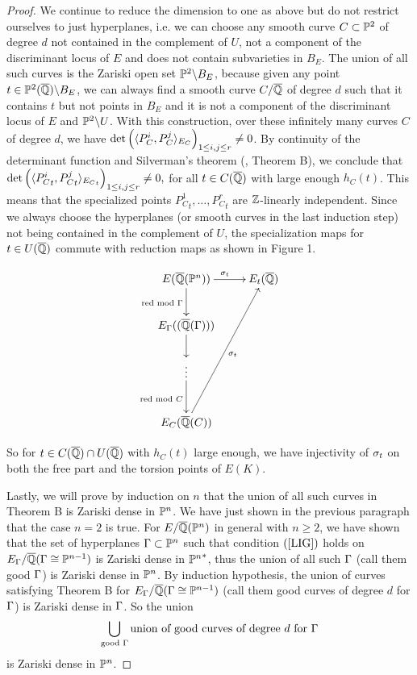 \documentclass[12pt,reqno]{amsart}
\begin{document}
\begin{proof}
We continue to reduce the dimension to one as above but do not restrict ourselves to just hyperplanes, i.e. we can choose any smooth curve $C \subset \mathbb{P}^2$ of degree $d$ not contained in the complement of $U$, not a component of the discriminant locus of $E$ and does not contain subvarieties in $B_E$. The union of all such curves is the Zariski open set $\mathbb{P}^2\backslash B_E$, because given any point $t \in \mathbb{P}^2(\overline{\mathbb{Q}})\backslash B_E$, we can always find a smooth curve $C/\overline{\mathbb{Q}}$ of degree $d$ such that it contains $t$ but not points in $B_E$ and it is not a component of the discriminant locus of $E$ and $\mathbb{P}^2\backslash U$. With this construction, over these infinitely many curves $C$ of degree $d$, we have $\det \left( \langle P^i_C, P^j_C\rangle_{E_C} \right)_{1\leq i,j\leq r} \neq 0$. By continuity of the determinant function and Silverman's theorem (\cite{SHS}, Theorem B), we conclude that 
$\det \left( \langle{P^i_C}_t, {P^j_C}_t\rangle_{{E_C}_t} \right)_{1\leq i,j\leq r} \neq 0,$ for all $t \in C(\overline{\mathbb{Q}})$ with large enough $h_C(t)$. This means that the specialized points ${P^1_C}_t, \ldots, {P^r_C}_t$ are $\mathbb{Z}$-linearly independent. Since we always choose the hyperplanes (or smooth curves in the last induction step) not being contained in the complement of $U$, the specialization maps for $t \in U(\overline{\mathbb{Q}})$ commute with reduction maps as shown in Figure 1.
\begin{figure}
$$\xymatrix{
E(\CQ(\PP^n)) \ar@{->}[r]^{\s_t} \ar@{->}[d]_{\text{red mod $\G$}} 
&E_t(\CQ)  \\
E_\G((\CQ(\G))) \ar@{->}[d] & \\
\vdots \ar@{->}[d]_{\text{red mod $C$}} & \\
E_C(\CQ(C)) \ar@{->}[uuur]_{\s_t} 
}$$
\caption{}
\end{figure}
So for $t \in C(\overline{\mathbb{Q}}) \cap U(\overline{\mathbb{Q}})$ with $h_C(t)$ large enough, we have injectivity of $\sigma_t$ on both the free part and the torsion points of $E(K)$. 

Lastly, we will prove by induction on $n$ that the union of all such curves in Theorem B is Zariski dense in $\mathbb{P}^n$. We have just shown in the previous paragraph that the case $n=2$ is true. For $E/\overline{\mathbb{Q}}(\mathbb{P}^n)$ in general with $n \geq 2$, we have shown that the set of hyperplanes $\Gamma \subset \mathbb{P}^n$ such that condition $(\ref{LIG})$ holds on $E_\Gamma/\overline{\mathbb{Q}}(\Gamma\cong \mathbb{P}^{n-1})$ is Zariski dense in ${\mathbb{P}^n}^*$, thus the union of all such $\Gamma$ (call them good $\Gamma$) is Zariski dense in $\mathbb{P}^n$. By induction hypothesis, the union of curves satisfying Theorem B for $E_\Gamma/\overline{\mathbb{Q}}(\Gamma\cong \mathbb{P}^{n-1})$ (call them good curves of degree $d$ for $\Gamma$) is Zariski dense in $\Gamma$. So the union 
$$ \bigcup_{\text{good $\Gamma$}} \text{union of good curves of degree $d$ for $\Gamma$}$$ is Zariski dense in $\mathbb{P}^n$.
\end{proof}
\end{document}
